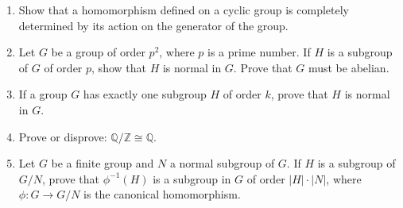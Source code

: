 {\begin{enumerate}
 
\item
Show that a homomorphism defined on a cyclic group is completely
determined by its action on the generator of the group.


 
 
\item
Let $G$ be a group of order $p^2$, where $p$ is a prime number. If $H$
is a subgroup of $G$ of order $p$, show that $H$ is normal in $G$.
Prove that $G$ must be abelian. 
 
 
\item
If a group $G$ has exactly one subgroup $H$ of order $k$, prove that
$H$ is normal in $G$. 
 
 
\item
Prove or disprove: ${\mathbb Q} / {\mathbb Z} \cong {\mathbb Q}$.
 
 
% 
% 
% 
% 
% 
% 
% 
% 
 
\item
Let $G$ be a finite group and $N$ a normal subgroup of $G$. If $H$ is
a subgroup of $G/N$, prove that $\phi^{-1}(H)$ is a subgroup in $G$ of
order $|H| \cdot |N|$, where $\phi : G \rightarrow G/N$ is the
canonical homomorphism. 
 
 
% 
%
% 


\end{enumerate}}
